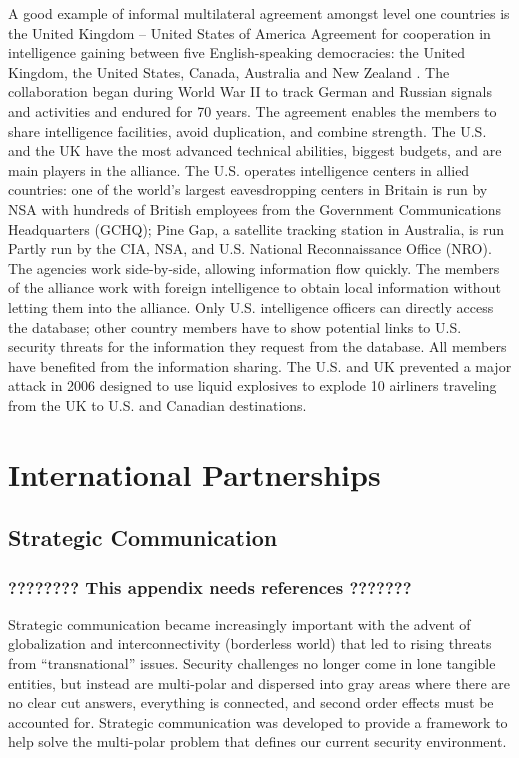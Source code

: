 \documentclass{report}
\begin{document}
A good example of informal multilateral agreement amongst level one countries is the United Kingdom – United States of America Agreement for cooperation in intelligence gaining between five English-speaking democracies: the United Kingdom, the United States, Canada, Australia and New Zealand \cite{Cox2012}. The collaboration began during World War II to track German and Russian signals and activities and endured for 70 years. The agreement enables the members to share intelligence facilities, avoid duplication, and combine strength. The U.S. and the UK have the most advanced technical abilities, biggest budgets, and are main players in the alliance. The U.S. operates intelligence centers in allied countries: one of the world's largest eavesdropping centers in Britain is run by NSA with hundreds of British employees from the Government Communications Headquarters (GCHQ); Pine Gap, a satellite tracking station in Australia, is run Partly run by the CIA, NSA, and U.S. National Reconnaissance Office (NRO). The agencies work side-by-side, allowing information flow quickly. The members of the alliance work with foreign intelligence to obtain local information without letting them into the alliance. Only U.S. intelligence officers can directly access the database; other country members have to show potential links to U.S. security threats for the information they request from the database. All members have benefited from the information sharing. The U.S. and UK prevented a major attack in 2006 designed to use liquid explosives to explode 10 airliners traveling from the UK to U.S. and Canadian destinations. 


\chapter[Appendix C: International Partnerships]{International Partnerships} \label{app:partners}

\section{Strategic Communication }

\subsection{????????  This appendix needs references  ???????}


Strategic communication became increasingly important with the advent of globalization and interconnectivity (borderless world) that led to rising threats from \enquote{transnational} issues. Security challenges no longer come in lone tangible entities, but instead are multi-polar and dispersed into gray areas where there are no clear cut answers, everything is connected, and second order effects must be accounted for. Strategic communication was developed to provide a framework to help solve the multi-polar problem that defines our current security environment.
\end{document}
